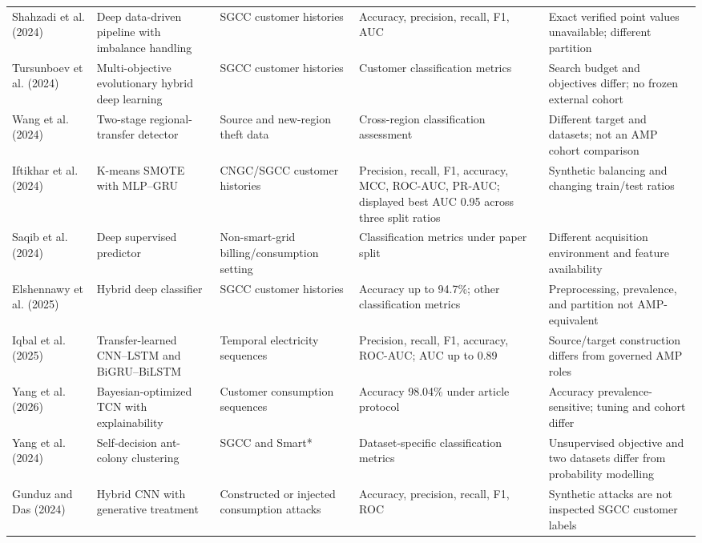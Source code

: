 \begin{longtable}{@{}P{0.13\textwidth}P{0.18\textwidth}P{0.16\textwidth}P{0.25\textwidth}P{0.20\textwidth}@{}}
Shahzadi et al. (2024) & Deep data-driven pipeline with imbalance handling & SGCC customer histories & Accuracy, precision, recall, F1, AUC & Exact verified point values unavailable; different partition \\
Tursunboev et al. (2024) & Multi-objective evolutionary hybrid deep learning & SGCC customer histories & Customer classification metrics & Search budget and objectives differ; no frozen external cohort \\
Wang et al. (2024) & Two-stage regional-transfer detector & Source and new-region theft data & Cross-region classification assessment & Different target and datasets; not an AMP cohort comparison \\
Iftikhar et al. (2024) & K-means SMOTE with MLP--GRU & CNGC/SGCC customer histories & Precision, recall, F1, accuracy, MCC, ROC-AUC, PR-AUC; displayed best AUC 0.95 across three split ratios & Synthetic balancing and changing train/test ratios \\
Saqib et al. (2024) & Deep supervised predictor & Non-smart-grid billing/consumption setting & Classification metrics under paper split & Different acquisition environment and feature availability \\
Elshennawy et al. (2025) & Hybrid deep classifier & SGCC customer histories & Accuracy up to 94.7\%; other classification metrics & Preprocessing, prevalence, and partition not AMP-equivalent \\
Iqbal et al. (2025) & Transfer-learned CNN--LSTM and BiGRU--BiLSTM & Temporal electricity sequences & Precision, recall, F1, accuracy, ROC-AUC; AUC up to 0.89 & Source/target construction differs from governed AMP roles \\
Yang et al. (2026) & Bayesian-optimized TCN with explainability & Customer consumption sequences & Accuracy 98.04\% under article protocol & Accuracy prevalence-sensitive; tuning and cohort differ \\
Yang et al. (2024) & Self-decision ant-colony clustering & SGCC and Smart* & Dataset-specific classification metrics & Unsupervised objective and two datasets differ from probability modelling \\
Gunduz and Das (2024) & Hybrid CNN with generative treatment & Constructed or injected consumption attacks & Accuracy, precision, recall, F1, ROC & Synthetic attacks are not inspected SGCC customer labels \\
\end{longtable}
\endgroup
